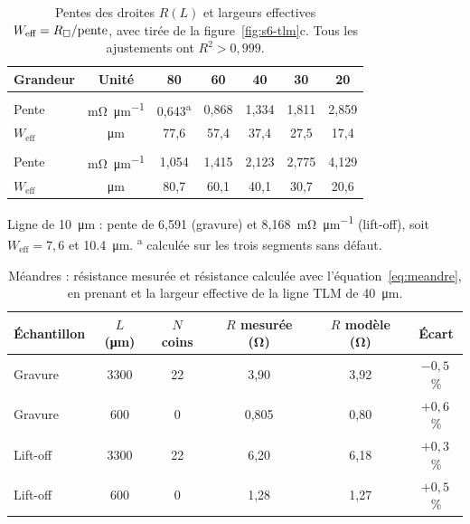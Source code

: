 \begin{table}[H]
  \centering\footnotesize
  \setlength{\tabcolsep}{4pt}
  \caption{Pentes des droites $R(L)$ et largeurs effectives $W_\text{eff} = R_{\square}/\text{pente}$, avec \Rsq{} tirée de la figure~\ref{fig:s6-tlm}c. Tous les ajustements ont $R^2 > 0{,}999$.}
  \label{tab:s6-tlm}
  \begin{tabularx}{\linewidth}{@{}>{\raggedright\arraybackslash}X c c c c c c@{}}
    \toprule
    \textbf{Grandeur} & \textbf{Unité} & \textbf{80} & \textbf{60} & \textbf{40} & \textbf{30} & \textbf{20} \\
    \midrule
    \multicolumn{7}{@{}l}{\textbf{Gravure} ($\Rsq = 49{,}8$~\unit{\milli\ohm}, $\Delta W = \qty{2,5}{\micro\metre}$)} \\
    Pente & \unit{\milli\ohm\per\micro\metre} & 0,643\textsuperscript{a} & 0,868 & 1,334 & 1,811 & 2,859 \\
    $W_\text{eff}$ & \unit{\micro\metre} & 77,6 & 57,4 & 37,4 & 27,5 & 17,4 \\
    \midrule
    \multicolumn{7}{@{}l}{\textbf{Lift-off} ($\Rsq = 85{,}1$~\unit{\milli\ohm}, $\Delta W = \qty{-0,4}{\micro\metre}$)} \\
    Pente & \unit{\milli\ohm\per\micro\metre} & 1,054 & 1,415 & 2,123 & 2,775 & 4,129 \\
    $W_\text{eff}$ & \unit{\micro\metre} & 80,7 & 60,1 & 40,1 & 30,7 & 20,6 \\
    \bottomrule
  \end{tabularx}

  \vspace{2pt}
  {\scriptsize Ligne de \qty{10}{\micro\metre} : pente de 6,591 (gravure) et 8,168~\unit{\milli\ohm\per\micro\metre} (lift-off), soit $W_\text{eff} = 7{,}6$ et \qty{10,4}{\micro\metre}. \textsuperscript{a} calculée sur les trois segments sans défaut.}
\end{table}

\begin{table}[H]
  \centering\footnotesize
  \setlength{\tabcolsep}{4pt}
  \caption{Méandres : résistance mesurée et résistance calculée avec l'équation~\eqref{eq:meandre}, en prenant \Rsq{} et la largeur effective de la ligne TLM de \qty{40}{\micro\metre}.}
  \label{tab:s6-meandres}
  \begin{tabularx}{\linewidth}{@{}>{\raggedright\arraybackslash}X c c c c c@{}}
    \toprule
    \textbf{Échantillon} & \textbf{$L$ (\unit{\micro\metre})} & \textbf{$N$ coins} & \textbf{$R$ mesurée (\unit{\ohm})} & \textbf{$R$ modèle (\unit{\ohm})} & \textbf{Écart} \\
    \midrule
    Gravure  & 3300 & 22 & 3,90  & 3,92 & $-0{,}5$\,\% \\
    Gravure  & 600  & 0  & 0,805 & 0,80 & $+0{,}6$\,\% \\
    Lift-off & 3300 & 22 & 6,20  & 6,18 & $+0{,}3$\,\% \\
    Lift-off & 600  & 0  & 1,28  & 1,27 & $+0{,}5$\,\% \\
    \bottomrule
  \end{tabularx}
\end{table}

